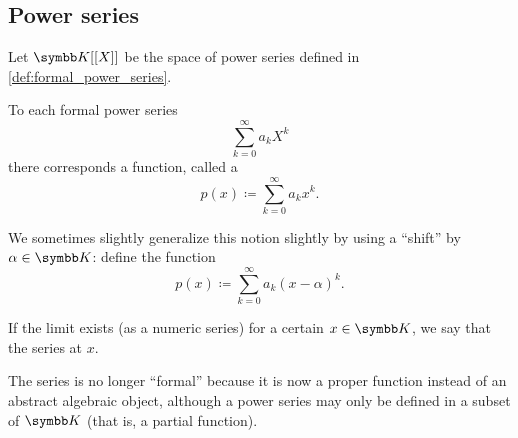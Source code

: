 \subsection{Power series}\label{subsec:power_series}

\begin{definition}\label{def:convergent_power_series}
  Let \( \BK[[X]] \) be the space of power series defined in \cref{def:formal_power_series}.

  To each formal power series
  \begin{equation*}
    \sum_{k=0}^\infty a_k X^k
  \end{equation*}
  there corresponds a function, called a 
  \begin{equation}\label{def:convergent_power_series/series}
    p(x) \coloneqq \sum_{k=0}^\infty a_k x^k.
  \end{equation}

  We sometimes slightly generalize this notion slightly by using a \enquote{shift} by \( \alpha \in \BK \): define the function
  \begin{equation}\label{def:convergent_power_series/shifted_series}
    p(x) \coloneqq \sum_{k=0}^\infty a_k (x - \alpha)^k.
  \end{equation}

  If the limit exists (as a numeric series) for a certain \( x \in \BK \), we say that the series  at \( x \).

  The series is no longer \enquote{formal} because it is now a proper function instead of an abstract algebraic object, although a power series may only be defined in a subset of \( \BK \) (that is, a partial function).
\end{definition}

